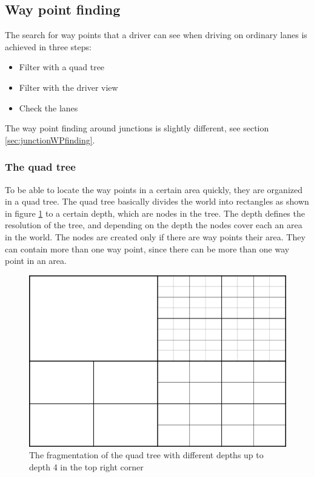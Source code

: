 \subsection{Way point finding}

The search for way points that a driver can see when driving on ordinary lanes 
is achieved in three steps:

\begin{itemize}
\item Filter with a quad tree
\item Filter with the driver view
\item Check the lanes
\end{itemize}

The way point finding around junctions is slightly different, see section 
\ref{sec:junctionWPfinding}.

\subsubsection{The quad tree}
\label{sec:quadTree}

To be able to locate the way points in a certain area quickly, they are
organized in a quad tree. The quad tree basically divides the world
into rectangles as shown in figure \ref{fig:quadTree} to a certain
depth, which are nodes in the tree. The depth defines the resolution
of the tree, and depending on the depth the nodes cover each an area
in the world. The nodes are created only if there are way points their
area. They can contain more than one way point, since there can be more
than one way point in an area.\\

\begin{figure}[H]
\begin{center}
\includegraphics[scale=0.5]{images/quadtree.png}
\end{center}
\caption{The fragmentation of the quad tree with different depths up to depth 
4 in the top right corner}
\label{fig:quadTree}
\end{figure}

